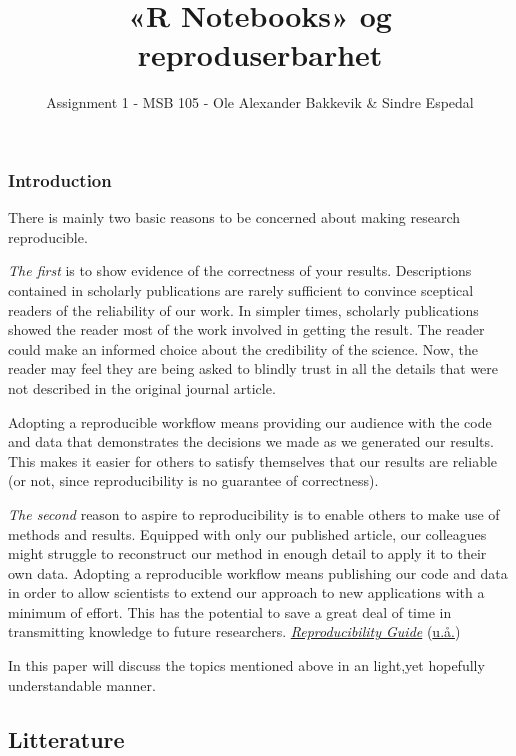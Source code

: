 \documentclass[
  12pt,
  norsk,
]{article}
\title{«R Notebooks» og reproduserbarhet}
\author{Assignment 1 - MSB 105 - Ole Alexander Bakkevik \& Sindre
Espedal}
\date{}
\begin{document}
\maketitle

\hypertarget{introduction}{%
\subsubsection{Introduction}\label{introduction}}

There is mainly two basic reasons to be concerned about making research
reproducible.

\emph{The first} is to show evidence of the correctness of your results.
Descriptions contained in scholarly publications are rarely sufficient
to convince sceptical readers of the reliability of our work. In simpler
times, scholarly publications showed the reader most of the work
involved in getting the result. The reader could make an informed choice
about the credibility of the science. Now, the reader may feel they are
being asked to blindly trust in all the details that were not described
in the original journal article.

Adopting a reproducible workflow means providing our audience with the
code and data that demonstrates the decisions we made as we generated
our results. This makes it easier for others to satisfy themselves that
our results are reliable (or not, since reproducibility is no guarantee
of correctness).

\emph{The second} reason to aspire to reproducibility is to enable
others to make use of methods and results. Equipped with only our
published article, our colleagues might struggle to reconstruct our
method in enough detail to apply it to their own data. Adopting a
reproducible workflow means publishing our code and data in order to
allow scientists to extend our approach to new applications with a
minimum of effort. This has the potential to save a great deal of time
in transmitting knowledge to future researchers.
\protect\hyperlink{ref-Git-reproducabilty}{\emph{Reproducibility Guide}}
(\protect\hyperlink{ref-Git-reproducabilty}{u.å.})

In this paper will discuss the topics mentioned above in an light,yet
hopefully understandable manner.

\hypertarget{litterature}{%
\subsection{Litterature}\label{litterature}}
\end{document}
